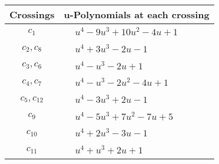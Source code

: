 \documentclass[1p]{elsarticle_modified}
\theoremstyle{definition}
\begin{document}
\begin{tabular}{m{50pt}|m{274pt}}
Crossings & \hspace{64pt}u-Polynomials at each crossing \\
\hline $$\begin{aligned}c_{1}\end{aligned}$$&$\begin{aligned}
&u^4-9 u^3+10 u^2-4 u+1
\end{aligned}$\\
\hline $$\begin{aligned}c_{2},c_{8}\end{aligned}$$&$\begin{aligned}
&u^4+3 u^3-2 u-1
\end{aligned}$\\
\hline $$\begin{aligned}c_{3},c_{6}\end{aligned}$$&$\begin{aligned}
&u^4- u^3-2 u+1
\end{aligned}$\\
\hline $$\begin{aligned}c_{4},c_{7}\end{aligned}$$&$\begin{aligned}
&u^4- u^3-2 u^2-4 u+1
\end{aligned}$\\
\hline $$\begin{aligned}c_{5},c_{12}\end{aligned}$$&$\begin{aligned}
&u^4-3 u^3+2 u-1
\end{aligned}$\\
\hline $$\begin{aligned}c_{9}\end{aligned}$$&$\begin{aligned}
&u^4-5 u^3+7 u^2-7 u+5
\end{aligned}$\\
\hline $$\begin{aligned}c_{10}\end{aligned}$$&$\begin{aligned}
&u^4+2 u^3-3 u-1
\end{aligned}$\\
\hline $$\begin{aligned}c_{11}\end{aligned}$$&$\begin{aligned}
&u^4+u^3+2 u+1
\end{aligned}$\\
\hline
\end{tabular}\\~\\
\end{document}
